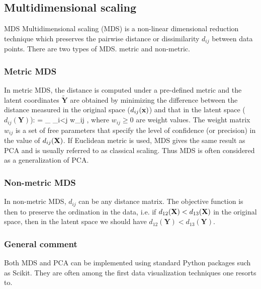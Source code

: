 \subsection{Multidimensional scaling}
\label{subsec:dimRedMDS}
\begin{mybox}{MDS}
	Multidimensional scaling (MDS) is a non-linear dimensional reduction technique which preserves the pairwise distance or dissimilarity $d_{ij}$ between data points. There are two types of MDS. metric and non-metric.
\end{mybox}
\subsubsection{Metric MDS}
In metric MDS, the distance is computed under a pre-defined metric and the latent coordinates $\tilde{\mathbf{Y}}$ are obtained by minimizing the difference between the distance measured in the original space ($d_{ij}(\mathbf{x})$) and that in the latent space ($d_{ij}(\mathbf{Y})$):
\be 
\label{eq:dimRedMDS}
 = \arg \min_{} \sum_{i<j} w_{ij} ,
\ee 
where $w_{ij}\geq 0$ are weight values. The weight matrix $w_{ij}$ is a set of free parameters that specify the level of confidence (or precision) in the value of $d_{ij}(\mathbf{X})$. If Euclidean metric is used, MDS gives the same result as PCA and is usually referred to as classical scaling. Thus MDS is often considered as a generalization of PCA.

\subsubsection{Non-metric MDS}
In non-metric MDS, $d_{ij}$ can be any distance matrix. The objective function is then to preserve the ordination in the data, i.e. if $d_{12}(\mathbf{X}) < d_{13}(\mathbf{X})$  in the original space, then in the latent space we should have $d_{12}(\mathbf{Y})< d_{13}(\mathbf{Y})$.

\subsubsection{General comment}
Both MDS and PCA can be implemented using standard Python packages such as Scikit. They are often among the first data visualization techniques one resorts to.

